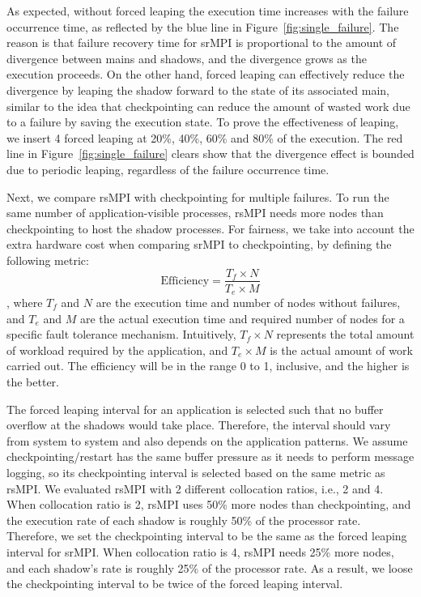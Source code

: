 As expected, without forced leaping the execution time increases with the failure occurrence time, as reflected by the blue line in Figure~\ref{fig:single_failure}. The reason is that failure recovery time for srMPI is proportional to the amount of divergence between mains and shadows, and the divergence grows as the execution proceeds. On the other hand, forced leaping can effectively reduce the divergence by leaping the shadow forward to the state of its associated main, similar to the idea that checkpointing can reduce the amount of wasted work due to a failure by saving the execution state. To prove the effectiveness of leaping, we insert 4 forced leaping at 20\%, 40\%, 60\% and 80\% of the execution. The red line in Figure~\ref{fig:single_failure} clears show that the divergence effect is bounded due to periodic leaping, regardless of the failure occurrence time.

Next, we compare rsMPI with checkpointing for multiple failures. To run the same number of application-visible processes, rsMPI needs more nodes than checkpointing to host the shadow processes. For fairness, we take into account the extra hardware cost when comparing srMPI to checkpointing, by defining the following metric:
$$\text{Efficiency} = \frac{T_f \times N}{T_e \times M}$$
, where $T_f$ and $N$ are the execution time and number of nodes without failures, and $T_e$ and $M$ are the actual execution time and required number of nodes for a specific fault tolerance mechanism. Intuitively, $T_f \times N$ represents the total amount of workload required by the application, and $T_e \times M$ is the actual amount of work carried out. The efficiency will be in the range 0 to 1, inclusive, and the higher is the better.

The forced leaping interval for an application is selected such that no buffer overflow at the shadows would take place. Therefore, the interval should vary from system to system and also depends on the application patterns. We assume checkpointing/restart has the same buffer pressure as it needs to perform message logging, so its checkpointing interval is selected based on the same metric as rsMPI. We evaluated rsMPI with 2 different collocation ratios, i.e., 2 and 4. When collocation ratio is 2, rsMPI uses 50\% more nodes than checkpointing, and the execution rate of each shadow is roughly 50\% of the processor rate. Therefore, we set the checkpointing interval to be the same as the forced leaping interval for srMPI. When collocation ratio is 4, rsMPI needs 25\% more nodes, and each shadow's rate is roughly 25\% of the processor rate. As a result, we loose the checkpointing interval to be twice of the forced leaping interval. 

